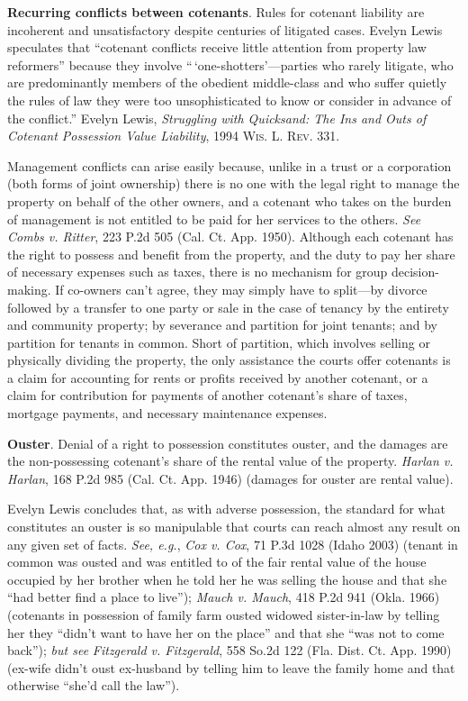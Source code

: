 
\item \textbf{Recurring conflicts between cotenants}. Rules for cotenant
liability are incoherent and unsatisfactory despite centuries of litigated
cases. Evelyn Lewis speculates that ``cotenant conflicts receive little
attention from property law reformers'' because they involve
``\,`one-shotters'---parties who rarely litigate, who are predominantly members
of the obedient middle-class and who suffer quietly the rules of law they were
too unsophisticated to know or consider in advance of the conflict.'' Evelyn
Lewis, \textit{Struggling with Quicksand: The Ins and Outs of Cotenant
Possession Value Liability}, 1994 \textsc{Wis. L. Rev}. 331.


Management conflicts can arise easily because, unlike in a trust or a
corporation (both forms of joint ownership) there is no one with the legal
right to manage the property on behalf of the other owners, and a cotenant who
takes on the burden of management is not entitled to be paid for her services
to the others. \emph{See} \emph{Combs v. Ritter}, 223 P.2d 505 (Cal. Ct. App.
1950). Although each cotenant has the right to possess and benefit from the
property, and the duty to pay her share of necessary expenses such as taxes,
there is no mechanism for group decision-making. If co-owners can't agree, they
may simply have to split---by divorce followed by a transfer to one party or
sale in the case of tenancy by the entirety and community property; by severance
and partition for joint tenants; and by partition for tenants in common. Short
of partition, which involves selling or physically dividing the property, the
only assistance the courts offer cotenants is a claim for accounting for rents
or profits received by another cotenant, or a claim for contribution for
payments of another cotenant's share of taxes, mortgage payments, and necessary
maintenance expenses.



\item \textbf{Ouster}. Denial of a right to possession constitutes ouster, and
the damages are the non-possessing cotenant's share of the rental value of the
property. \emph{Harlan v. Harlan}, 168 P.2d 985 (Cal. Ct. App. 1946) (damages
for ouster are rental value).


Evelyn Lewis concludes that, as with adverse possession, the standard for what
constitutes an ouster is so manipulable that courts can reach almost any result
on any given set of facts. \emph{See, e.g.}, \emph{Cox v. Cox}, 71 P.3d 1028
(Idaho 2003) (tenant in common was ousted and was entitled to {\textonehalf} of
the fair rental value of the house occupied by her brother when he told her he
was selling the house and that she ``had better find a place to live'');
\emph{Mauch v. Mauch}, 418 P.2d 941 (Okla. 1966) (cotenants in possession of
family farm ousted widowed sister-in-law by telling her they ``didn't want to
have her on the place'' and that she ``was not to come back''); \emph{but see}
\emph{Fitzgerald v. Fitzgerald}, 558 So.2d 122 (Fla. Dist. Ct. App. 1990)
(ex-wife didn't oust ex-husband by telling him to leave the family home and that
otherwise ``she'd call the law'').


